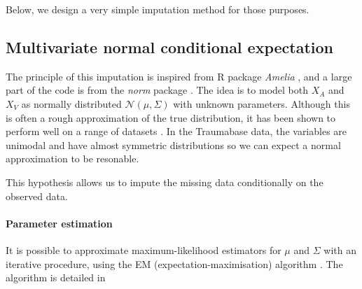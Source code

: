 Below, we design a very simple imputation method for those purposes.

		\subsection{Multivariate normal conditional expectation}
The principle of this imputation is inspired from R package \emph{Amelia} \cite{ref_amelia}, and a large part of the code is from the \emph{norm} package \cite{pkg_norm}. The idea is to model both $X_A$ and $X_V$ as normally distributed $\mathcal{N}(\mu, \Sigma)$ with unknown parameters. Although this is often a rough approximation of the true distribution, it has been shown to  perform well on a range of datasets \cite{MICE_founding}\cite{schafer1998multiple}. In the Traumabase data, the variables are unimodal and have almost symmetric distributions so we can expect a normal approximation to be resonable.

This hypothesis allows us to impute the missing data conditionally on the observed data.

\paragraph{Parameter estimation}
It is possible to approximate maximum-likelihood estimators for $\mu$ and $\Sigma$ with an iterative procedure, using the EM (expectation-maximisation) algorithm \cite{EM}. The algorithm is detailed in \cite[Chapter 5.3]{em_normal_fit}


